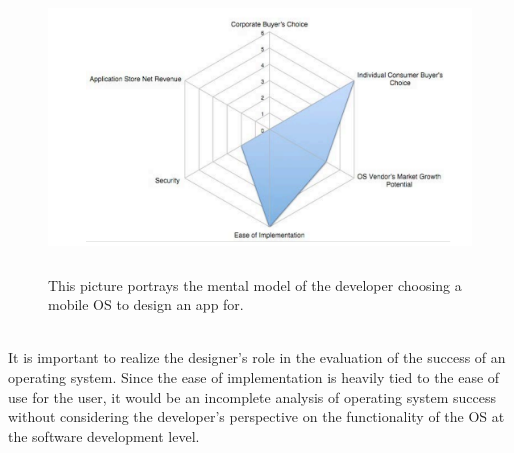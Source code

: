 \documentclass[11pt]{article}
\begin{document}
\begin{figure}[h]
\begin{center}
\includegraphics[height = 3in]{developerPerspective}
\caption{This picture portrays the mental model of the developer choosing a mobile OS to design an app for. \cite{Palme}}
\label{developerPerspective}
\end{center} %
\end{figure} \\
It is important to realize the designer's role in the evaluation of the success of an operating system. Since the ease of implementation is heavily tied to the ease of use for the user, it would be an incomplete analysis of operating system success without considering the developer's perspective on the functionality of the OS at the software development level.
%
\end{document}

